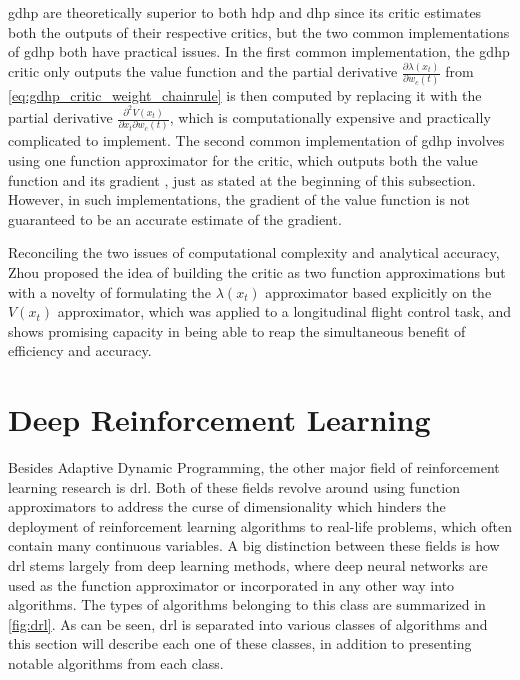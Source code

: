 \documentclass[../report.tex]{subfiles}
\begin{document}
\ac{gdhp} are theoretically superior to both \ac{hdp} and \ac{dhp} since its critic estimates both the outputs of their respective critics, but the two common implementations of \ac{gdhp} both have practical issues. In the first common implementation, the \ac{gdhp} critic only outputs the value function \cite{igdhp_erik, gdhp_impl1} and the partial derivative $\frac{\partial \lambda(x_t)}{\partial w_c(t)}$ from \autoref{eq:gdhp_critic_weight_chainrule} is then computed by replacing it with the partial derivative $\frac{\partial^2 V(x_t)}{\partial x_t \partial w_c(t)}$, which is computationally expensive and practically complicated to implement. The second common implementation of \ac{gdhp} involves using one function approximator for the critic, which outputs both the value function and its gradient \cite{fault_tolerant_gdhp, gdhp_impl2_a, gdhp_impl2_b}, just as stated at the beginning of this subsection. However, in such implementations, the gradient of the value function is not guaranteed to be an accurate estimate of the gradient.

Reconciling the two issues of computational complexity and analytical accuracy, Zhou \cite{zhou_igdhp} proposed the idea of building the critic as two function approximations but with a novelty of formulating the $\lambda(x_t)$ approximator based explicitly on the $V(x_t)$ approximator, which was applied to a longitudinal flight control task, and shows promising capacity in being able to reap the simultaneous benefit of efficiency and accuracy.


\section{Deep Reinforcement Learning}

Besides Adaptive Dynamic Programming, the other major field of reinforcement learning research is \ac{drl}. Both of these fields revolve around using function approximators \cite{function_approximators} to address the curse of dimensionality which hinders the deployment of reinforcement learning algorithms to real-life problems, which often contain many continuous variables. A big distinction between these fields is how \ac{drl} stems largely from deep learning methods, where deep neural networks are used as the function approximator or incorporated in any other way into algorithms. The types of algorithms belonging to this class are summarized in \autoref{fig:drl}. As can be seen, \ac{drl} is separated into various classes of algorithms and this section will describe each one of these classes, in addition to presenting notable algorithms from each class.
\end{document}
